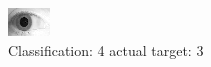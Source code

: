 \begin{figure}[h!]
\begin{center}
\includegraphics[width=0.60\columnwidth]{figures/ID1930_class_4_target_3.png}
\end{center}
\caption{ Classification: 4 actual target: 3}
\label{fig:ID1930_class_4_target_3}
\end{figure}
